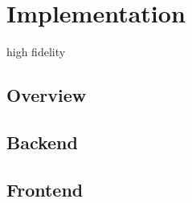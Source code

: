 \section{Implementation} \label{implementation}

high fidelity

    \subsection{Overview}

    \subsection{Backend}

    \subsection{Frontend}
